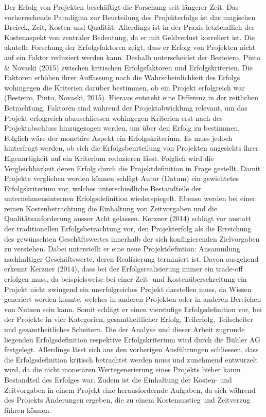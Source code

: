 \newline
Der Erfolg von Projekten beschäftigt die Forschung seit längerer Zeit. Das vorherrschende Paradigma zur Beurteilung des Projekterfolgs ist das magischen Dreieck, Zeit, Kosten und Qualität. Allerdings ist in der Praxis letztendlich der Kostenaspekt von zentraler Bedeutung, da er mit Geldverlust korreliert ist. Die akutelle Forschung der Erfolgsfaktoren zeigt, dass er Erfolg von Projekten nicht auf ein Faktor reduziert werden kann. Deshalb unterscheidet der Besteiero, Pinto \& Novaski (2015) zwischen kritischen Erfolgsfaktoren und Erfolgskriterien. Die Faktoren erhöhen ihrer Auffassung nach die Wahrscheinlichkeit des Erfolgs wohingegen die Kriterien darüber bestimmen, ob ein Projekt erfolgreich war (Besteiro, Pinto, Novaski, 2015). Hieraus entsteht eine Differenz in der zeitlichen Betrachtung, Faktoren sind während der Projektabwicklung relevant, um das Projekt erfolgreich abzuschliessen wohingegen Kriterien erst nach des Projektabschluss hinzugezogen werden, um über den Erfolg zu bestimmen. Folglich wäre der monetäre Aspekt ein Erfolgskriterium. Es muss jedoch hinterfragt werden, ob sich die Erfolgsbeurteilung von Projekten angesichts ihrer Eigenartigkeit auf ein Kriterium reduzieren lässt. Folglich wird die Vergleichbarkeit deren Erfolg durch die Projektdefinition in Frage gestellt. Damit Projekte verglichen werden können schlägt Autor (Datum) ein gewichtetes Erfolgskriterium vor, welches unterschiedliche Bestandteile der unternehmensinternen Erfolgsdefinition wiederspiegelt. Ebenso werden bei einer reinen Kostenbetrachtung die Einhaltung von Zeitvorgaben und die Qualitätsanforderung ausser Acht gelassen. Kerzner (2014) schlägt vor anstatt der traditionellen Erfolgsbetrachtung vor, den Projekterfolg als die Erreichung des gewünschten Geschäftswertes innerhalb der sich konfligierenden Zielvorgaben zu verstehen. Dabei  unterstellt er eine neue Projektdefintion: Ansammlung nachhaltiger Geschäftswerte, deren Realisierung terminiert ist. Davon ausgehend erkennt Kerzner (2014), dass bei der Erfolgsrealisierung immer ein trade-off erfolgen muss, da beispielsweise bei einer Zeit- und Kostenüberschreitung ein Projekt nicht zwingend ein unerfolgreiches Projekt darstellen muss, da Wissen generiert werden konnte, welches in anderen Projekten oder in anderen Bereichen von Nutzen sein kann. Somit schlägt er einen vierstufige Erfolgsdefinition vor, bei der Projekte in vier Kategorien, gesamtheitlicher Erfolg, Teilerfolg, Teilscheiter und gesamtheitliches Scheitern. Die der Analyse und dieser Arbeit zugrunde liegenden Erfolgsdefinition respektive Erfolgskriterium wird durch die Bühler AG festgelegt. Allerdings lässt sich aus den vorherigen Ausführungen schliessen, dass die Erfolgsdefinition kritisch betrachtet werden muss und zunehmend entwurzelt wird, da die nicht monetären Wertegenerierung eines Projekts bisher kaum Bestandteil des Erfolges war. Zudem ist die Einhaltung der Kosten- und Zeitvorgaben in einem Projekt eine herausfordernde Aufgaben, da sich während des Projekts Änderungen ergeben, die zu einem Kostenanstieg und Zeitverzug führen können.
